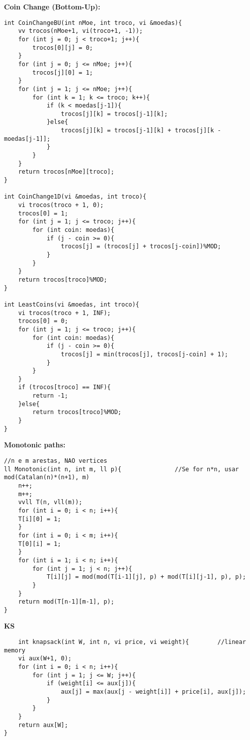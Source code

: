\documentclass{article}
\begin{document}
\large
\huge\textbf{Coin Change (Bottom-Up):}
\large
\begin{lstlisting}
int CoinChangeBU(int nMoe, int troco, vi &moedas){
	vv trocos(nMoe+1, vi(troco+1, -1));
	for (int j = 0; j < troco+1; j++){
		trocos[0][j] = 0;
	}
	for (int j = 0; j <= nMoe; j++){
		trocos[j][0] = 1;
	}
	for (int j = 1; j <= nMoe; j++){
		for (int k = 1; k <= troco; k++){
			if (k < moedas[j-1]){
				trocos[j][k] = trocos[j-1][k];
			}else{
				trocos[j][k] = trocos[j-1][k] + trocos[j][k - moedas[j-1]];
			}
		}
	}
	return trocos[nMoe][troco];
}

int CoinChange1D(vi &moedas, int troco){
	vi trocos(troco + 1, 0);
	trocos[0] = 1;
	for (int j = 1; j <= troco; j++){
		for (int coin: moedas){
			if (j - coin >= 0){
				trocos[j] = (trocos[j] + trocos[j-coin])%MOD;
			}
		}
	}
	return trocos[troco]%MOD;
}

int LeastCoins(vi &moedas, int troco){
	vi trocos(troco + 1, INF);
	trocos[0] = 0;
	for (int j = 1; j <= troco; j++){
		for (int coin: moedas){
			if (j - coin >= 0){
				trocos[j] = min(trocos[j], trocos[j-coin] + 1);
			}
		}
	}
	if (trocos[troco] == INF){
		return -1;
	}else{
		return trocos[troco]%MOD;
	}
}
\end{lstlisting}

\large
\huge\textbf{Monotonic paths:}
\large
\begin{lstlisting}
//n e m arestas, NAO vertices
ll Monotonic(int n, int m, ll p){				//Se for n*n, usar mod(Catalan(n)*(n+1), m)
	n++;
	m++;
	vvll T(n, vll(m));
	for (int i = 0; i < n; i++){
	T[i][0] = 1;
	}
	for (int i = 0; i < m; i++){
	T[0][i] = 1;
	}
	for (int i = 1; i < n; i++){
		for (int j = 1; j < n; j++){
			T[i][j] = mod(mod(T[i-1][j], p) + mod(T[i][j-1], p), p);
		}
	}
	return mod(T[n-1][m-1], p);
}
\end{lstlisting}

\large
\huge\textbf{KS}
\large
\begin{lstlisting}
    int knapsack(int W, int n, vi price, vi weight){        //linear memory
	vi aux(W+1, 0);
	for (int i = 0; i < n; i++){
		for (int j = 1; j <= W; j++){
			if (weight[i] <= aux[j]){
				aux[j] = max(aux[j - weight[i]] + price[i], aux[j]);
			}
		}
	}
	return aux[W];
}
\end{lstlisting}
\end{document}
